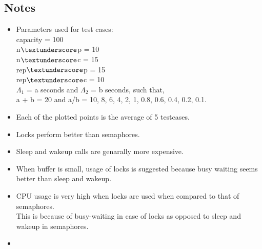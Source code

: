 \documentclass[12pt]{article}
\begin{document}
\subsection{Notes}
\begin{itemize}
\item Parameters used for test cases:\\
capacity = 100\\
n$\textunderscore$p = 10\\
n$\textunderscore$c = 15\\
rep$\textunderscore$p = 15\\
rep$\textunderscore$c = 10\\
$\Lambda _1$ = a seconds and $\Lambda _2$ = b seconds, such that,\\
a + b = 20 and a/b = 10, 8, 6, 4, 2, 1, 0.8, 0.6, 0.4, 0.2, 0.1.
\item Each of the plotted points is the average of 5 testcases.\\
\item Locks perform better than semaphores.
\item Sleep and wakeup calls are genarally more expensive.
\item When buffer is small, usage of locks is suggested because busy waiting seems better than sleep and wakeup.
\item CPU usage is very high when locks are used when compared to that of semaphores.\\
This is because of busy-waiting in case of locks as opposed to sleep and wakeup in semaphores.
\item 
\end{itemize}
\end{document}
